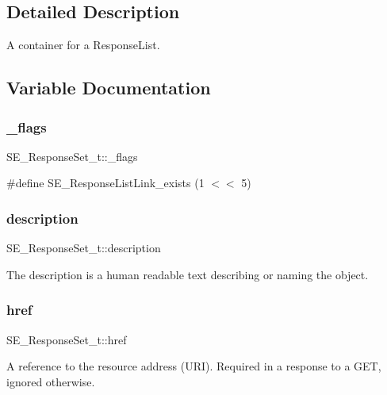 \subsection{Detailed Description}
A container for a Response\+List. 

\subsection{Variable Documentation}
\mbox{\label{group__ResponseSet_gab868eef3d41febb6b3e414b6c13a4f1b}} 
\subsubsection{\texorpdfstring{\+\_\+flags}{\_flags}}
{\footnotesize\ttfamily S\+E\+\_\+\+Response\+Set\+\_\+t\+::\+\_\+flags}

\#define S\+E\+\_\+\+Response\+List\+Link\+\_\+exists (1 $<$$<$ 5) \mbox{\label{group__ResponseSet_ga718d5e90f483d93f6a1928b98f4195c9}} 
\subsubsection{\texorpdfstring{description}{description}}
{\footnotesize\ttfamily S\+E\+\_\+\+Response\+Set\+\_\+t\+::description}

The description is a human readable text describing or naming the object. \mbox{\label{group__ResponseSet_gab8c5075bf443fd440f1a68ae0d6bd848}} 
\subsubsection{\texorpdfstring{href}{href}}
{\footnotesize\ttfamily S\+E\+\_\+\+Response\+Set\+\_\+t\+::href}

A reference to the resource address (U\+RI). Required in a response to a G\+ET, ignored otherwise. \mbox{\label{group__ResponseSet_ga1d199a43dbc543c9fb19c99aca6ef451}} 
